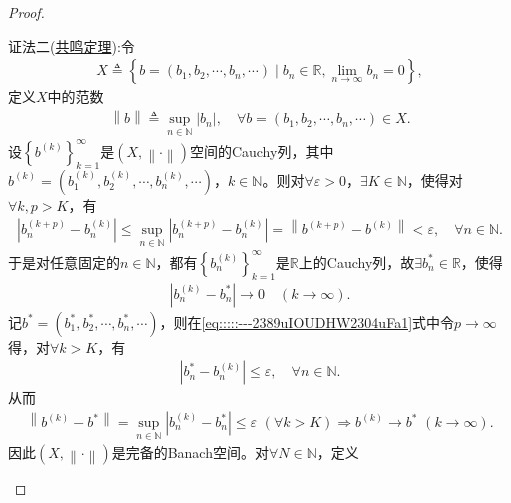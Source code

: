 \documentclass[../../main.tex]{subfiles}%
\begin{document}
\begin{proof}
\begin{enumerate}[(1)]
{\color{blue}证法二(\hyperref[Functional Analysis-theorem:泛函分析--共鸣定理]{共鸣定理}):}令
\begin{align*}
X\triangleq \left\{ b=\left( b_1,b_2,\cdots ,b_n,\cdots \right) \mid b_n\in \mathbb{R} ,\lim\limits_{n\rightarrow \infty}b_n=0 \right\},
\end{align*}
定义$X$中的范数
\begin{align*}
\left\| b \right\| \triangleq \sup\limits_{n\in \mathbb{N}}\left| b_n \right|,\quad \forall b=\left( b_1,b_2,\cdots ,b_n,\cdots \right) \in X.
\end{align*}
设$\left\{ b^{\left( k \right)} \right\}_{k=1}^{\infty}$是$\left( X,\left\| \cdot \right\| \right)$空间的Cauchy列，其中$b^{\left( k \right)}=\left( b_{1}^{\left( k \right)},b_{2}^{\left( k \right)},\cdots ,b_{n}^{\left( k \right)},\cdots \right)$，$k\in \mathbb{N}$。则对$\forall \varepsilon >0$，$\exists K\in \mathbb{N}$，使得对$\forall k,p>K$，有
\begin{align}
\left| b_{n}^{\left( k+p \right)}-b_{n}^{\left( k \right)} \right|\leqslant \sup\limits_{n\in \mathbb{N}}\left| b_{n}^{\left( k+p \right)}-b_{n}^{\left( k \right)} \right|=\left\| b^{\left( k+p \right)}-b^{\left( k \right)} \right\| <\varepsilon ,\quad \forall n\in \mathbb{N}.
\label{eq:::::---2389uIOUDHW2304uFa1}
\end{align}
于是对任意固定的$n\in \mathbb{N}$，都有$\left\{ b_{n}^{\left( k \right)} \right\}_{k=1}^{\infty}$是$\mathbb{R}$上的Cauchy列，故$\exists b_{n}^{*}\in \mathbb{R}$，使得
\begin{align*}
\left| b_{n}^{\left( k \right)}-b_{n}^{*} \right|\rightarrow 0\quad \left( k\rightarrow \infty \right).
\end{align*}
记$b^*=\left( b_{1}^{*},b_{2}^{*},\cdots ,b_{n}^{*},\cdots \right)$，则在\eqref{eq:::::---2389uIOUDHW2304uFa1}式中令$p\rightarrow \infty$得，对$\forall k>K$，有
\begin{align*}
\left| b_{n}^{*}-b_{n}^{\left( k \right)} \right|\leqslant \varepsilon ,\quad \forall n\in \mathbb{N}.
\end{align*}
从而
\begin{align*}
\left\| b^{\left( k \right)}-b^* \right\| =\sup\limits_{n\in \mathbb{N}}\left| b_{n}^{\left( k \right)}-b_{n}^{*} \right|\leqslant \varepsilon \,\,\left( \forall k>K \right) \Longrightarrow b^{\left( k \right)}\rightarrow b^*\,\,\left( k\rightarrow \infty \right).
\end{align*}
因此$\left( X,\left\| \cdot \right\| \right)$是完备的Banach空间。对$\forall N\in \mathbb{N}$，定义

\end{enumerate}
\end{proof}
\end{document}
